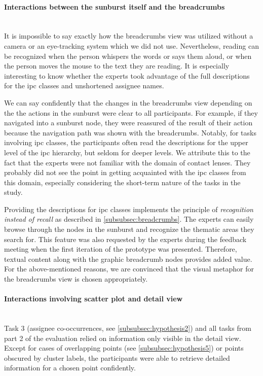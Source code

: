 \paragraph{Interactions between the sunburst itself and the breadcrumbs}~\\
It is impossible to say exactly how the breadcrumbs view was utilized without a camera or an eye-tracking system which we did not use.
Nevertheless, reading can be recognized when the person whispers the words or says them aloud, or when the person moves the mouse to the text they are reading.
It is especially interesting to know whether the experts took advantage of the full descriptions for the \gls{ipc} classes and unshortened assignee names.

We can say confidently that the changes in the breadcrumbs view depending on the the actions in the sunburst were clear to all participants.
For example, if they navigated into a sunburst node, they were reassured of the result of their action because the navigation path was shown with the breadcrumbs.
Notably, for tasks involving \gls{ipc} classes, the participants often read the descriptions for the upper level of the \gls{ipc} hierarchy, but seldom for deeper levels.
We attribute this to the fact that the experts were not familiar with the domain of contact lenses.
They probably did not see the point in getting acquainted with the \gls{ipc} classes from this domain, especially considering the short-term nature of the tasks in the study.

Providing the descriptions for \gls{ipc} classes implements the principle of \textit{recognition instead of recall} as described in \autoref{subsubsec:breadcrumbs}.
The experts can easily browse through the nodes in the sunburst and recognize the thematic areas they search for.
This feature was also requested by the experts during the feedback meeting when the first iteration of the prototype was presented.
Therefore, textual content along with the graphic breadcrumb nodes provides added value.
For the above-mentioned reasons, we are convinced that the visual metaphor for the breadcrumbs view is chosen appropriately.

\paragraph{Interactions involving scatter plot and detail view}~\\
Task 3 (assignee co-occurrences, see \autoref{subsubsec:hypothesis2}) and all tasks from part 2 of the evaluation relied on information only visible in the detail view.
Except for cases of overlapping points (see \autoref{subsubsec:hypothesis5}) or points obscured by cluster labels, the participants were able to retrieve detailed information for a chosen point confidently.

